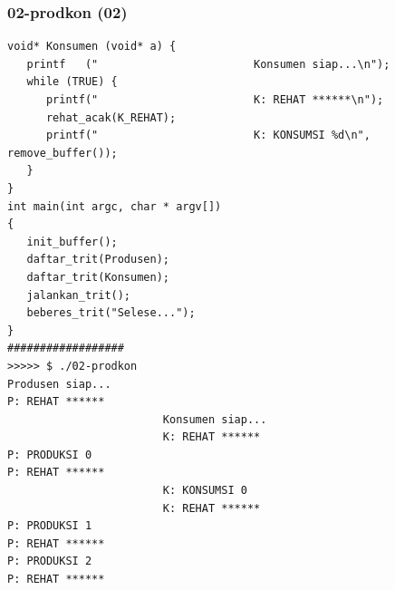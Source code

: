 \documentclass[aspectratio=169, xcolor=table, notheorems, hyperref={pdfpagelabels=false}]{beamer}
\begin{document}
\begin{frame}[fragile]
\frametitle{02-prodkon (02)}
\begin{lstlisting}[basicstyle=\ttfamily\tiny]
void* Konsumen (void* a) {
   printf   ("                        Konsumen siap...\n");
   while (TRUE) {
      printf("                        K: REHAT ******\n");
      rehat_acak(K_REHAT);
      printf("                        K: KONSUMSI %d\n", remove_buffer());
   }
}
int main(int argc, char * argv[])
{
   init_buffer();
   daftar_trit(Produsen);
   daftar_trit(Konsumen);
   jalankan_trit();
   beberes_trit("Selese...");
}
##################
>>>>> $ ./02-prodkon 
Produsen siap...
P: REHAT ******
                        Konsumen siap...
                        K: REHAT ******
P: PRODUKSI 0
P: REHAT ******
                        K: KONSUMSI 0
                        K: REHAT ******
P: PRODUKSI 1
P: REHAT ******
P: PRODUKSI 2
P: REHAT ******

\end{lstlisting}
\end{frame}

\end{document}
